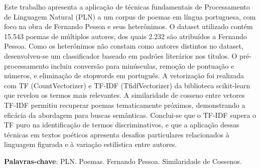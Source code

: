 \documentclass[
	article,
	12pt,
	oneside,
	a4paper,
	english,
	brazil,
	sumario=tradicional
]{abntex2}
\begin{document}

\frenchspacing

\maketitle

\begin{resumoumacoluna}
Este trabalho apresenta a aplicação de técnicas fundamentais de Processamento de Linguagem Natural (PLN) a um corpus de poemas em língua portuguesa, com foco na obra de Fernando Pessoa e seus heterônimos. O dataset utilizado contém 15.543 poemas de múltiplos autores, dos quais 2.232 são atribuídos a Fernando Pessoa. Como os heterônimos não constam como autores distintos no dataset, desenvolveu-se um classificador baseado em padrões literários nos títulos. O pré-processamento incluiu conversão para minúsculas, remoção de pontuação e números, e eliminação de stopwords em português. A vetorização foi realizada com TF (CountVectorizer) e TF-IDF (TfidfVectorizer) da biblioteca scikit-learn que revelou os termos mais relevantes. A similaridade de cosseno entre vetores TF-IDF permitiu recuperar poemas tematicamente próximos, demonstrando a eficácia da abordagem para buscas semânticas. Conclui-se que o TF-IDF supera o TF puro na identificação de termos discriminativos, e que a aplicação dessas técnicas em textos poéticos apresenta desafios particulares relacionados à linguagem figurada e à variação estilística entre autores.

\vspace{\onelineskip}

\noindent
\textbf{Palavras-chave}: PLN. Poemas. Fernando Pessoa. Similaridade de Cossenos.
\end{resumoumacoluna}
\end{document}

